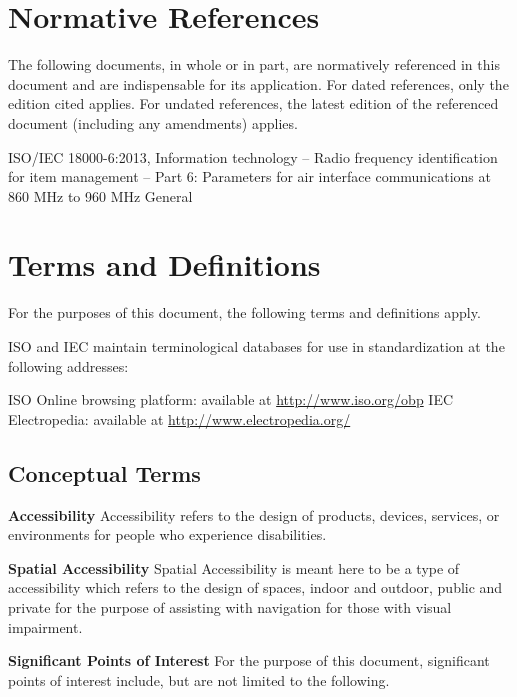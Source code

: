 \documentclass{article}
\begin{document}
\section{Normative References}

The following documents, in whole or in part, are normatively referenced in this document and are indispensable for its application. For dated references, only the edition cited applies. For undated references, the latest edition of the referenced document (including any amendments) applies. \medskip

ISO/IEC 18000-6:2013, Information technology -- Radio frequency identification for item management -- Part 6: Parameters for air interface communications at 860 MHz to 960 MHz General

\section{Terms and Definitions}

For the purposes of this document, the following terms and definitions apply. \medskip

ISO and IEC maintain terminological databases for use in standardization at the following addresses: \medskip

ISO Online browsing platform: available at \url{http://www.iso.org/obp} \newline
IEC Electropedia: available at \url{http://www.electropedia.org/} \medskip

\subsection{Conceptual Terms}

\textbf{Accessibility} 
\newline
Accessibility refers to the design of products, devices, services, or environments for people who experience disabilities. \medskip

\textbf{Spatial Accessibility}
\newline
Spatial Accessibility is meant here to be a type of accessibility which refers to the design of spaces, indoor and outdoor, public and private for the purpose of assisting with navigation for those with visual impairment. \medskip

\textbf{Significant Points of Interest}
\newline
For the purpose of this document, significant points of interest include, but are not limited to the following.
\end{document}

